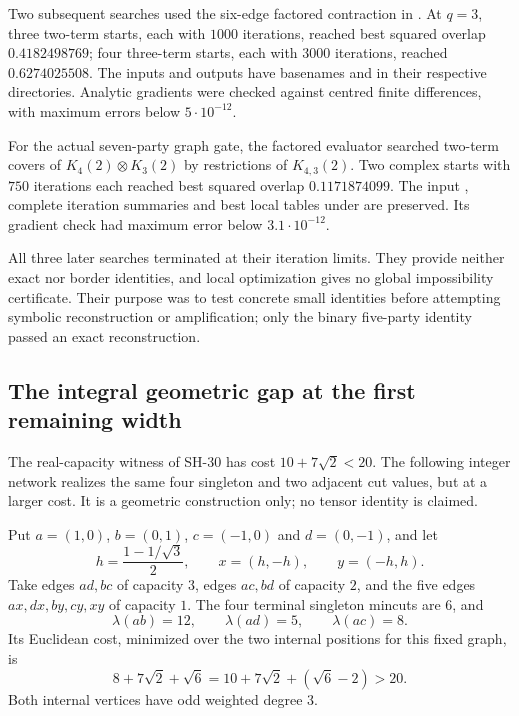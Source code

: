 Two subsequent searches used the six-edge factored contraction
in .
At $q=3$, three two-term starts, each with $1000$ iterations,
reached best squared overlap $0.4182498769$; four three-term
starts, each with $3000$ iterations, reached
$0.6274025508$.  The inputs and outputs have basenames
 and
 in their respective directories.
Analytic gradients were checked against centred finite
differences, with maximum errors below $5\cdot10^{-12}$.

For the actual seven-party graph gate, the factored evaluator
 searched
two-term covers of $K_4(2)\otimes K_3(2)$ by restrictions
of $K_{4,3}(2)$.  Two complex starts with $750$ iterations
each reached best squared overlap $0.1171874099$.
The input ,
complete iteration summaries and best local tables under
 are preserved.
Its gradient check had maximum error below
$3.1\cdot10^{-12}$.

All three later searches terminated at their iteration limits.
They provide neither exact nor border identities, and local
optimization gives no global impossibility certificate.
Their purpose was to test concrete small identities before
attempting symbolic reconstruction or amplification; only
the binary five-party identity passed an exact reconstruction.

\subsection{The integral geometric gap at the first remaining width}

The real-capacity witness of SH-30 has cost $10+7\sqrt2<20$.
The following integer network realizes the same four singleton
and two adjacent cut values, but at a larger cost.  It is a
geometric construction only; no tensor identity is claimed.

\begin{proposition}
\label{prop:integer-critical-network}
Put $a=(1,0)$, $b=(0,1)$, $c=(-1,0)$ and $d=(0,-1)$, and let
\[
 h=\frac{1-1/\sqrt3}{2},\qquad x=(h,-h),\qquad y=(-h,h).
\]
Take edges $ad,bc$ of capacity $3$, edges $ac,bd$ of capacity
$2$, and the five edges $ax,dx,by,cy,xy$ of capacity $1$.
The four terminal singleton mincuts are $6$, and
\[
 \lambda(ab)=12,\qquad \lambda(ad)=5,\qquad \lambda(ac)=8.
\]
Its Euclidean cost, minimized over the two internal positions
for this fixed graph, is
\[
 8+7\sqrt2+\sqrt6
   =10+7\sqrt2+(\sqrt6-2)>20.
                                                        \tag{SH-34.1}
\]
Both internal vertices have odd weighted degree $3$.
\end{proposition}

